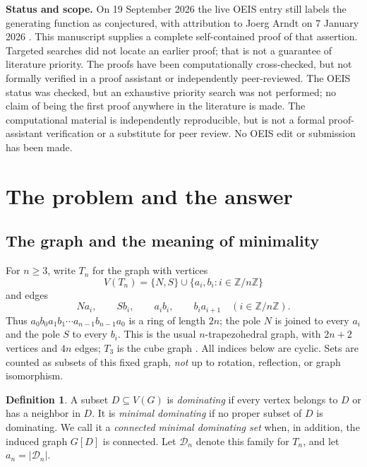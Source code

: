 \documentclass[11pt,letterpaper]{article}
\numberwithin{equation}{section}
\theoremstyle{definition}
\newtheorem{definition}[theorem]{Definition}
\newcommand{\Z}{\mathbb Z}
\newcommand{\CM}{\mathcal D}
\newcommand{\1}{\mathbf 1}
\begin{document}
\begin{resultbox}
\textbf{Status and scope.} On 19 September 2026 the live OEIS entry still labels
the generating function as conjectured, with attribution to Joerg Arndt on
7 January 2026 \cite{A381190}. This manuscript supplies a complete
self-contained proof of that assertion. Targeted searches did not locate an
earlier proof; that is not a guarantee of literature priority. The proofs have
been computationally cross-checked, but not formally verified in a proof
assistant or independently peer-reviewed. The OEIS status was checked, but an
exhaustive priority search was not performed; no claim of being the first proof
anywhere in the literature is made. The computational material is independently
reproducible, but is not a formal proof-assistant verification or a substitute
for peer review. No OEIS edit or submission has been made.
\end{resultbox}

\newpage
{\small\setlength{\parskip}{0pt}\tableofcontents}
\newpage

\section{The problem and the answer}\label{sec:problem}

\subsection{The graph and the meaning of minimality}
For $n\ge3$, write $T_n$ for the graph with vertices
\[
 V(T_n)=\{N,S\}\cup\{a_i,b_i:i\in\Z/n\Z\}
\]
and edges
\begin{equation}\label{eq:edges}
 Na_i,\qquad Sb_i,\qquad a_ib_i,\qquad b_ia_{i+1}
 \quad(i\in\Z/n\Z).
\end{equation}
Thus $a_0b_0a_1b_1\cdots a_{n-1}b_{n-1}a_0$ is a ring of length $2n$;
the pole $N$ is joined to every $a_i$ and the pole $S$ to every $b_i$.
This is the usual $n$-trapezohedral graph, with $2n+2$ vertices and $4n$ edges;
$T_3$ is the cube graph \cite{trapezohedral}. All indices below are cyclic.
Sets are counted as subsets of this fixed graph, \emph{not} up to rotation,
reflection, or graph isomorphism.

\begin{definition}
A subset $D\subseteq V(G)$ is \emph{dominating} if every vertex belongs to $D$
or has a neighbor in $D$. It is \emph{minimal dominating} if no proper subset
of $D$ is dominating. We call it a \emph{connected minimal dominating set}
when, in addition, the induced graph $G[D]$ is connected. Let $\CM_n$ denote
this family for $T_n$, and let $a_n=|\CM_n|$.
\end{definition}
\end{document}
